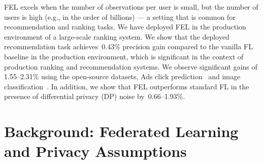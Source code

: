 \documentclass{article}
\newcommand{\il}[1]{\sethlcolor{yellow}\hl{[Ilias: #1]}}
\begin{document}
FEL excels when the number of observations per user is small, but the number of users is high (e.g., in the order of billions) --- a setting that is common for recommendation and ranking tasks.
We have deployed FEL in the production environment of a large-scale ranking system. We show that the deployed recommendation task achieves~0.43\% precision gain compared to the vanilla FL baseline in the production environment, which is significant in the context of production ranking and recommendation systems. %
We observe significant gains of 1.55--2.31\% using the open-source datasets, Ads click prediction~\cite{taobao} and image classification~\cite{liu2015deep}.
In addition, we show that FEL outperforms standard FL in the presence of differential privacy (DP) noise by~0.66--1.93\%.






\section{Background: Federated Learning and Privacy Assumptions}
\vspace{-0.25cm}

\end{document}
